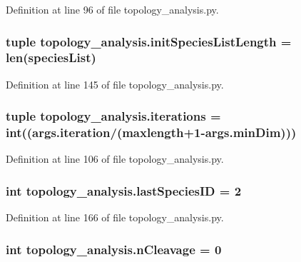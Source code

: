 Definition at line 96 of file topology\-\_\-analysis.\-py.

\hypertarget{a00128_af2370a811b14632a793a28e451be8150}{
\subsubsection[{init\-Species\-List\-Length}]{\setlength{\rightskip}{0pt plus 5cm}tuple topology\-\_\-analysis.\-init\-Species\-List\-Length = len({\bf species\-List})}}\label{a00128_af2370a811b14632a793a28e451be8150}


Definition at line 145 of file topology\-\_\-analysis.\-py.

\hypertarget{a00128_a2117e01e4647cbdecc0ece27cec1cff4}{
\subsubsection[{iterations}]{\setlength{\rightskip}{0pt plus 5cm}tuple topology\-\_\-analysis.\-iterations = int((args.\-iteration/(maxlength+1-\/args.\-min\-Dim)))}}\label{a00128_a2117e01e4647cbdecc0ece27cec1cff4}


Definition at line 106 of file topology\-\_\-analysis.\-py.

\hypertarget{a00128_a1aa5d59ebf308accb3c960b5fd90a445}{
\subsubsection[{last\-Species\-I\-D}]{\setlength{\rightskip}{0pt plus 5cm}int topology\-\_\-analysis.\-last\-Species\-I\-D = 2}}\label{a00128_a1aa5d59ebf308accb3c960b5fd90a445}


Definition at line 166 of file topology\-\_\-analysis.\-py.

\hypertarget{a00128_a9975713682889eae03088e5575e1a0e4}{
\subsubsection[{n\-Cleavage}]{\setlength{\rightskip}{0pt plus 5cm}int topology\-\_\-analysis.\-n\-Cleavage = 0}}\label{a00128_a9975713682889eae03088e5575e1a0e4}



